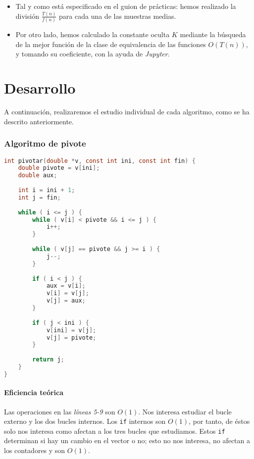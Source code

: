 \documentclass[10pt, a4paper]{article}
\theoremstyle{theorem-style}
\theoremstyle{theorem-style}
\theoremstyle{definition-style}
\theoremstyle{remark-style}
\theoremstyle{example-style}
\theoremstyle{definition-style}
\theoremstyle{remark-style}
\begin{document}
\begin{itemize}
	\item Tal y como está especificado en el guion de prácticas: hemos realizado la división $\frac{T(n)}{f(n)}$ para cada una de las muestras medias.
	\item Por otro lado, hemos calculado la constante oculta $K$ mediante la búsqueda de la mejor función de la clase de equivalencia de las funciones $O(T(n))$, y tomando su coeficiente, con la ayuda de \emph{Jupyter}.
\end{itemize}

\pagebreak
\part{Desarrollo}

A continuación, realizaremos el estudio individual de cada algoritmo, como se ha descrito anteriormente.

\section{Algoritmo de pivote}

\begin{lstlisting}[language=C]
int pivotar(double *v, const int ini, const int fin) {
	double pivote = v[ini];
	double aux;
	
	int i = ini + 1;
	int j = fin;
	
	while ( i <= j ) {
		while ( v[i] < pivote && i <= j ) {
			i++;
		}
	
		while ( v[j] == pivote && j >= i ) {
			j--;
		}
		
		if ( i < j ) {
			aux = v[i];
			v[i] = v[j];
			v[j] = aux;
		}
		
		if ( j < ini ) {
			v[ini] = v[j];
			v[j] = pivote;
		}
		
		return j;
	}
}
\end{lstlisting}

\subsection{Eficiencia teórica}

Las operaciones en las \emph{líneas 5-9} son $O(1)$. Nos interesa estudiar el bucle externo y los dos bucles internos. Los \texttt{if} internos son $O(1)$, por tanto, de éstos solo nos interesa como afectan a los tres bucles que estudiamos. Estos \texttt{if} determinan si hay un cambio en el vector o no; esto no nos interesa, no afectan a los contadores y son $O(1)$.
\end{document}
